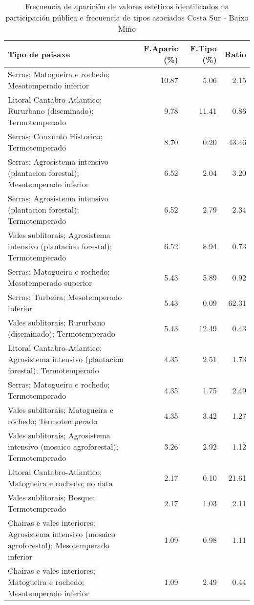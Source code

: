 \begin{table}[p]
\centering
\caption{Frecuencia de aparición de valores estéticos identificados na participación pública e frecuencia de tipos asociados Costa Sur - Baixo Miño} 
\label{vsixotest3}
\begin{tabular}{lrrr}
  \hline
Tipo de paisaxe & F.Aparic (\%) & F.Tipo (\%) & Ratio \\ 
  \hline
Serras; Matogueira e rochedo; Mesotemperado inferior & 10.87 & 5.06 & 2.15 \\ 
  Litoral Cantabro-Atlantico; Rururbano (diseminado); Termotemperado & 9.78 & 11.41 & 0.86 \\ 
  Serras; Conxunto Historico; Termotemperado & 8.70 & 0.20 & 43.46 \\ 
  Serras; Agrosistema intensivo (plantacion forestal); Mesotemperado inferior & 6.52 & 2.04 & 3.20 \\ 
  Serras; Agrosistema intensivo (plantacion forestal); Termotemperado & 6.52 & 2.79 & 2.34 \\ 
  Vales sublitorais; Agrosistema intensivo (plantacion forestal); Termotemperado & 6.52 & 8.94 & 0.73 \\ 
  Serras; Matogueira e rochedo; Mesotemperado superior & 5.43 & 5.89 & 0.92 \\ 
  Serras; Turbeira; Mesotemperado inferior & 5.43 & 0.09 & 62.31 \\ 
  Vales sublitorais; Rururbano (diseminado); Termotemperado & 5.43 & 12.49 & 0.43 \\ 
  Litoral Cantabro-Atlantico; Agrosistema intensivo (plantacion forestal); Termotemperado & 4.35 & 2.51 & 1.73 \\ 
  Serras; Matogueira e rochedo; Termotemperado & 4.35 & 1.75 & 2.49 \\ 
  Vales sublitorais; Matogueira e rochedo; Termotemperado & 4.35 & 3.42 & 1.27 \\ 
  Vales sublitorais; Agrosistema intensivo (mosaico agroforestal); Termotemperado & 3.26 & 2.92 & 1.12 \\ 
  Litoral Cantabro-Atlantico; Matogueira e rochedo; no data & 2.17 & 0.10 & 21.61 \\ 
  Vales sublitorais; Bosque; Termotemperado & 2.17 & 1.03 & 2.11 \\ 
  Chairas e vales interiores; Agrosistema intensivo (mosaico agroforestal); Mesotemperado inferior & 1.09 & 0.98 & 1.11 \\ 
  Chairas e vales interiores; Matogueira e rochedo; Mesotemperado inferior & 1.09 & 2.49 & 0.44 \\ 

\end{tabular}
\end{table}
